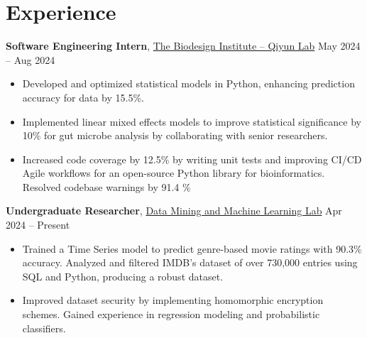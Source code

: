 \documentclass[11pt]{article}       %
\begin{document}
\section*{Experience}
\textbf{Software Engineering Intern}, \href{https://scikit.bio/}{The Biodesign Institute -- Qiyun Lab} \hfill May 2024 -- Aug 2024 \\
\vspace{-5pt}
\begin{itemize}


    \item Developed and optimized statistical models in Python, enhancing prediction accuracy for data by 15.5\%.
    \item Implemented linear mixed effects models to improve statistical significance by 10\% for gut microbe analysis by collaborating with senior researchers.
    \item Increased code coverage by 12.5\% by writing unit tests and improving CI/CD Agile workflows for an open-source Python library for bioinformatics. Resolved codebase warnings by 91.4 \%
\end{itemize}


\textbf{Undergraduate Researcher}, \href{https://dmml.asu.edu/}{Data Mining and Machine Learning Lab} \hfill Apr 2024 -- Present \\
\vspace{-5pt}
\begin{itemize}
\item Trained a Time Series model to predict genre-based movie ratings with 90.3\% accuracy. Analyzed and filtered IMDB’s dataset of over 730,000 entries using SQL and Python, producing a robust dataset. 
\item Improved dataset security by implementing homomorphic encryption schemes. Gained experience in regression modeling and probabilistic classifiers.
\end{itemize}
\end{document}
